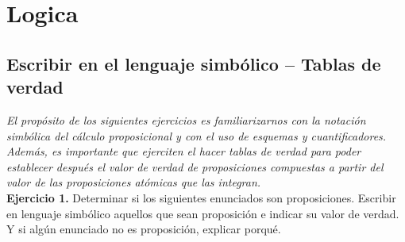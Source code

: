 \chapter{Logica}

\section{Escribir en el lenguaje simbólico – Tablas de verdad}

\textit{El propósito de los siguientes ejercicios es  familiarizarnos con la notación simbólica del cálculo proposicional y con el uso de esquemas y cuantificadores. Además, es importante que ejerciten el hacer tablas de verdad para poder establecer después el valor de verdad de proposiciones compuestas a partir del valor de las proposiciones atómicas que las integran.}\\

\textbf{Ejercicio 1.} Determinar si los siguientes enunciados son proposiciones. Escribir en lenguaje simbólico aquellos que sean
proposición e indicar su valor de verdad. Y si algún enunciado no es proposición, explicar porqué.

